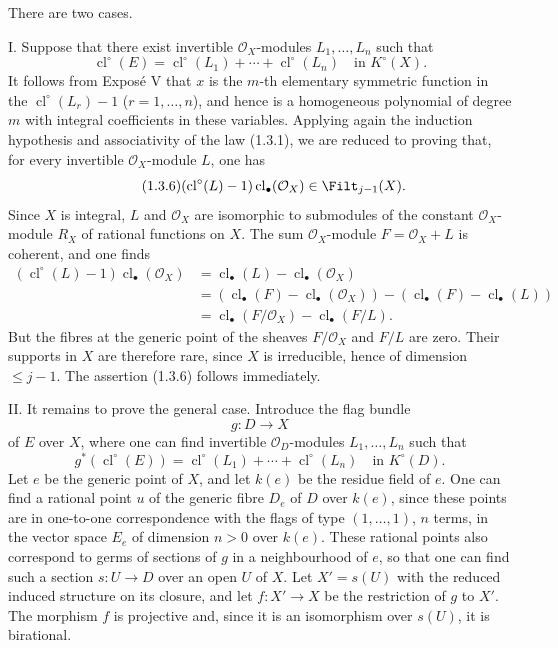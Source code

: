 \documentclass[11pt]{article}
\newcommand{\cl}{\operatorname{cl}}
\begin{document}
There are two cases.

I. Suppose that there exist invertible $\mathcal O_X$-modules $L_1,\ldots,L_n$ such that
\[
 \cl^\circ(E)=\cl^\circ(L_1)+\cdots+\cl^\circ(L_n)\quad\text{in }K^\circ(X).
\]
It follows from Exposé V that $x$ is the $m$-th elementary symmetric function in the $\cl^\circ(L_r)-1$ ($r=1,\ldots,n$), and hence is a homogeneous polynomial of degree $m$ with integral coefficients in these variables. Applying again the induction hypothesis and associativity of the law (1.3.1), we are reduced to proving that, for every invertible $\mathcal O_X$-module $L$, one has
\begin{equation}\tag{1.3.6}
 (\cl^\circ(L)-1)\cl_\bullet(\mathcal O_X)\in\Filt_{j-1}(X).
\end{equation}
Since $X$ is integral, $L$ and $\mathcal O_X$ are isomorphic to submodules of the constant $\mathcal O_X$-module $R_X$ of rational functions on $X$. The sum $\mathcal O_X$-module $F=\mathcal O_X+L$ is coherent, and one finds
\begin{align*}
 (\cl^\circ(L)-1)\cl_\bullet(\mathcal O_X)
 &=\cl_\bullet(L)-\cl_\bullet(\mathcal O_X)\\
 &=(\cl_\bullet(F)-\cl_\bullet(\mathcal O_X))-(\cl_\bullet(F)-\cl_\bullet(L))\\
 &=\cl_\bullet(F/\mathcal O_X)-\cl_\bullet(F/L).
\end{align*}
But the fibres at the generic point of the sheaves $F/\mathcal O_X$ and $F/L$ are zero. Their supports in $X$ are therefore rare, since $X$ is irreducible, hence of dimension $\leq j-1$. The assertion (1.3.6) follows immediately.

II. It remains to prove the general case. Introduce the flag bundle
\[
 g:D\longrightarrow X
\]
of $E$ over $X$, where one can find invertible $\mathcal O_D$-modules $L_1,\ldots,L_n$ such that
\begin{equation}\tag{1.3.7}
 g^*(\cl^\circ(E))=\cl^\circ(L_1)+\cdots+\cl^\circ(L_n)\quad\text{in }K^\circ(D).
\end{equation}
Let $e$ be the generic point of $X$, and let $k(e)$ be the residue field of $e$. One can find a rational point $u$ of the generic fibre $D_e$ of $D$ over $k(e)$, since these points are in one-to-one correspondence with the flags of type $(1,\ldots,1)$, $n$ terms, in the vector space $E_e$ of dimension $n>0$ over $k(e)$. These rational points also correspond to germs of sections of $g$ in a neighbourhood of $e$, so that one can find such a section $s:U\to D$ over an open $U$ of $X$. Let $X'=s(U)$ with the reduced induced structure on its closure, and let $f:X'\to X$ be the restriction of $g$ to $X'$. The morphism $f$ is projective and, since it is an isomorphism over $s(U)$, it is birational.
\end{document}
